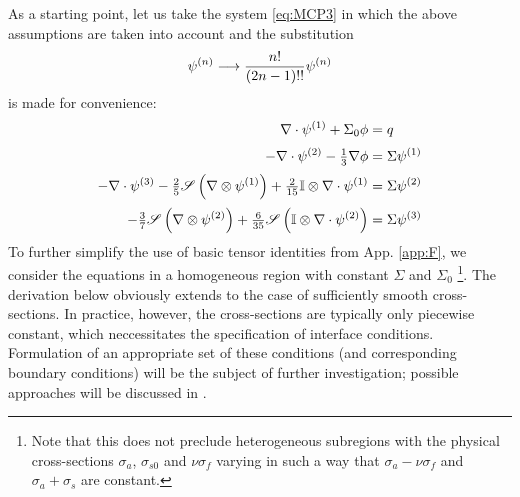 As a starting point, let us take the system \eqref{eq:MCP3} in which the above assumptions are taken into account and
the substitution 
$$
	\fmom[n] \longrightarrow \frac{n!}{(2n-1)!!} \fmom[n]
$$
is made for convenience:
\begin{align}
    \div\fmom[1] +   {\Sigma}_{0}\phi
  	  &=  q 				\label{eq:MCP3_1}  \\[.2em]
    -\div\fmom[2] - \tfrac13\del\phi     
      &=  \Sigma\fmom[1]	\label{eq:MCP3_2}  \\[.2em]
    -\div\fmom[3] - \tfrac25\Sym{\del\otimes\fmom[1]} + \tfrac{2}{15} \eye\otimes\div\fmom[1]
      &=  \Sigma\fmom[2]  	\label{eq:MCP3_3}  \\[.2em]
                         - \tfrac{3}{7}\Sym{\del\otimes\fmom[2]} + \tfrac{6}{35} \Sym{\eye\otimes\div\fmom[2]}
      &=  \Sigma\fmom[3]	\label{eq:MCP3_4}
\end{align}
To further simplify the use of basic tensor identities from App. \ref{app:F}, we consider the equations in a
homogeneous region with constant $\Sigma$ and $\Sigma_0$ \footnote{Note that
this does not preclude heterogeneous subregions with the physical cross-sections $\sigma_a$, $\sigma_{s0}$ and
$\nu\sigma_f$ varying in such a way that $\sigma_a - \nu\sigma_f$ and $\sigma_a + \sigma_s$ are constant.}.
The derivation below obviously extends to the case of sufficiently smooth cross-sections. In practice, however, the 
cross-sections are typically only piecewise constant, which neccessitates the specification of interface conditions. 
Formulation of an appropriate set of these conditions (and corresponding boundary conditions) will be the subject of 
further investigation; possible approaches will be discussed in .

